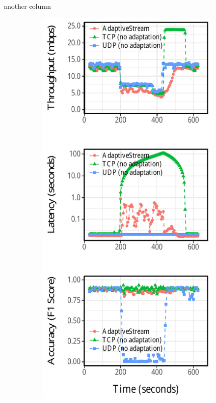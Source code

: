 \newpage

another column

\begin{figure}[!htb]
  \begin{subfigure}[t]{0.3\textwidth}
    \centering
    \includegraphics[width=\textwidth]{figures/runtime-mot-verticle.pdf}

\end{subfigure}
\end{figure}
